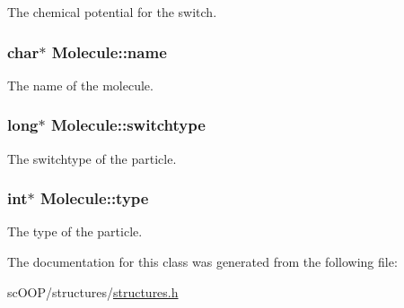 The chemical potential for the switch. 

\hypertarget{class_molecule_a905da45fb2ad1c821b7cf03c655c3047}{
\subsubsection[{name}]{\setlength{\rightskip}{0pt plus 5cm}char$\ast$ Molecule\+::name}}\label{class_molecule_a905da45fb2ad1c821b7cf03c655c3047}


The name of the molecule. 

\hypertarget{class_molecule_acf6cf0f43a015cff8dde7970e1ca3abd}{
\subsubsection[{switchtype}]{\setlength{\rightskip}{0pt plus 5cm}long$\ast$ Molecule\+::switchtype}}\label{class_molecule_acf6cf0f43a015cff8dde7970e1ca3abd}


The switchtype of the particle. 

\hypertarget{class_molecule_aa968965732a78fc8b2b60fc27d6374b6}{
\subsubsection[{type}]{\setlength{\rightskip}{0pt plus 5cm}int$\ast$ Molecule\+::type}}\label{class_molecule_aa968965732a78fc8b2b60fc27d6374b6}


The type of the particle. 



The documentation for this class was generated from the following file\+:\begin{DoxyCompactItemize}
\item 
sc\+O\+O\+P/structures/\hyperlink{structures_8h}{structures.\+h}\end{DoxyCompactItemize}
